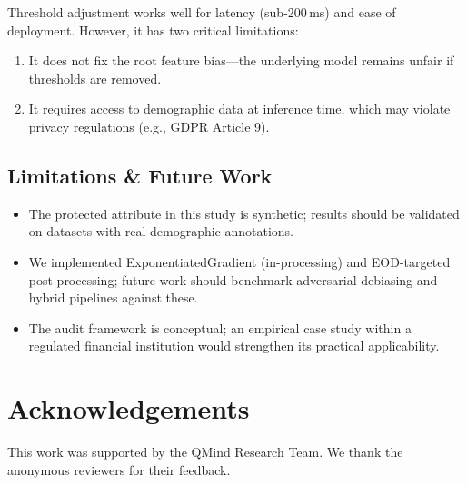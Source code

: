 \documentclass[conference]{IEEEtran}
\begin{document}
Threshold adjustment works well for latency (sub-200\,ms) and ease of deployment. However, it has two critical limitations:

\begin{enumerate}
\item It does not fix the root feature bias---the underlying model remains unfair if thresholds are removed.
\item It requires access to demographic data at inference time, which may violate privacy regulations (e.g., GDPR Article 9).
\end{enumerate}

\subsection{Limitations \& Future Work}

\begin{itemize}
\item The protected attribute in this study is synthetic; results should be validated
  on datasets with real demographic annotations.
\item We implemented ExponentiatedGradient (in-processing) and EOD-targeted
  post-processing; future work should benchmark adversarial debiasing and
  hybrid pipelines against these.
\item The audit framework is conceptual; an empirical case study within a regulated
  financial institution would strengthen its practical applicability.
\end{itemize}

\section*{Acknowledgements}
This work was supported by the QMind Research Team. We thank the anonymous reviewers for their feedback.
\end{document}
